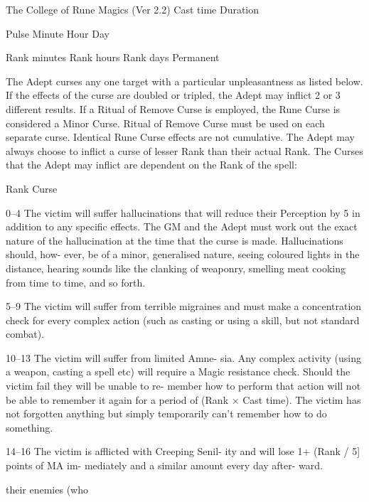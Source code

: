 \begin{Chapter}{The College of Rune Magics (Ver 2.2)}
Cast time  Duration  

Pulse 
Minute 
Hour 
Day 

Rank minutes  
Rank hours  
Rank days  
Permanent 

The  Adept  curses  any  one  target  with  a  particular 
unpleasantness as listed below. If the effects of the 
curse are doubled or tripled, the Adept may inflict 
2  or  3  different  results.  If  a  Ritual  of  Remove 
Curse is employed, the Rune Curse is considered a 
Minor  Curse.  Ritual  of  Remove  Curse  must  be 
used  on  each  separate  curse.  Identical  Rune  Curse 
effects are not cumulative. The Adept may always 
choose  to  inflict  a  curse  of  lesser  Rank  than  their 
actual Rank. The Curses that the Adept may inflict 
are dependent on the Rank of the spell: 

Rank Curse 

0–4  The  victim  will  suffer  hallucinations  that  will 
reduce  their  Perception  by  5  in  addition  to  any 
specific effects. The GM and the Adept must work 
out the exact nature of the hallucination at the time 
that the curse is made. Hallucinations should, how-
ever,  be  of  a  minor,  generalised  nature,  seeing 
coloured lights in the distance, hearing sounds like 
the  clanking  of  weaponry,  smelling  meat  cooking 
from time to time, and so forth. 

5–9  The  victim will  suffer  from terrible  migraines 
and  must  make  a  concentration  check  for  every 
complex action (such as casting or using a skill, but 
not standard combat). 

10–13  The  victim  will  suffer  from  limited  Amne-
sia. Any complex activity (using a weapon, casting 
a  spell  etc)  will  require  a  Magic  resistance  check. 
Should  the  victim  fail  they  will  be  unable  to  re-
member how to perform that action will not be able 
to remember it again for a period of  (Rank × Cast 
time).  The  victim  has  not  forgotten  anything  but 
simply  temporarily  can’t  remember  how  to  do 
something. 

14–16 The victim is afflicted with Creeping Senil-
ity  and  will  lose  1+  (Rank  /  5]  points  of  MA  im-
mediately  and  a  similar  amount  every  day  after-
ward. 

their  enemies  (who 


\end{Chapter}
